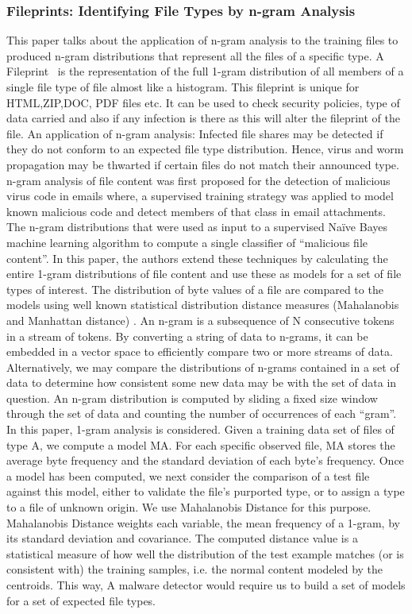 \documentclass[11pt]{article}
\begin{document}
		\subsubsection{Fileprints: Identifying File Types by n-gram Analysis}
		This paper talks about the application of n-gram analysis to the training files to produced n-gram distributions that represent all the files of a specific type.  A Fileprint~\cite{li2005fileprints} is the representation of the full 1-gram distribution of all members of a single file type of file almost like a histogram. This fileprint is unique for HTML,ZIP,DOC, PDF files etc. It can be used to check security policies, type of data carried and also if any infection is there as this will alter the fileprint of the file.
		An application of n-gram analysis: Infected file shares may be detected if they do not conform to an expected file type distribution. Hence, virus and worm propagation may be thwarted if certain files do not match their announced type. n-gram analysis of file content was first proposed for the detection of malicious virus code in emails where, a supervised training strategy was applied to model known malicious code and detect members of that class in email attachments. The n-gram distributions that were used as input to a supervised Naïve Bayes machine learning algorithm to compute a single classifier of “malicious file content”. In this paper, the authors extend these techniques by calculating the entire 1-gram distributions of file content and use these as models for a set of file types of interest. The distribution of byte values of a file are compared to the models using well known statistical distribution distance measures (Mahalanobis and Manhattan distance) \cite{li2005fileprints}. 
		An n-gram is a subsequence of N consecutive tokens in a stream of tokens. By converting a string of data to n-grams, it can be embedded in a vector space to efficiently compare two or more streams of data. Alternatively, we may compare the distributions of n-grams contained in a set of data to determine how consistent some new data may be with the set of data in question. An n-gram distribution is computed by sliding a fixed size window through the set of data and counting the number of occurrences of each “gram”. In this paper, 1-gram analysis is considered.
		Given a training data set of files of type A, we compute a model MA. For each specific observed file, MA stores the average byte frequency and the standard deviation of each byte’s frequency. Once a model has been computed, we next consider the comparison of a test file against this model, either to validate the file’s purported type, or to assign a type to a file of unknown origin. We use Mahalanobis Distance for this purpose. Mahalanobis Distance weights each variable, the mean frequency of a 1-gram, by its standard deviation and covariance. The computed distance value is a statistical measure of how well the distribution of the test example matches (or is consistent with) the training samples, i.e. the normal content modeled by the centroids. This way, A malware detector would require us to build a set of models for a set of expected file types.
\end{document}
